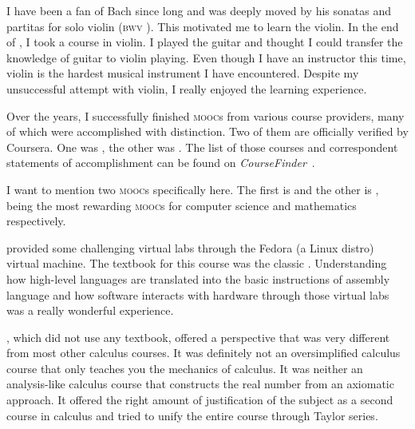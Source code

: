 	I have been a fan of Bach since long and was deeply moved by his sonatas and
	partitas for solo violin (\textsc{bwv} ). This motivated me to
	learn the violin. In the end of , I took a course in violin. I
	played the guitar and thought I could transfer the knowledge of guitar to
	violin playing. Even though I have an instructor this time, violin is the
	hardest musical instrument I have encountered. Despite my unsuccessful attempt
	with violin, I really enjoyed the learning experience.
	
	Over the years, I successfully finished  \textsc{mooc}s from various
	course providers, many of which were accomplished with distinction. Two of them
	are officially verified by Coursera. One was , the other
	was . The list of those  courses and correspondent
	statements of accomplishment can be found on
	\textit{CourseFinder}~\cite{accredible}.
	
	I want to mention two \textsc{mooc}s specifically here. The first is
	 and the other is , being the most rewarding
	\textsc{mooc}s for computer science and mathematics respectively.
	
	 provided some challenging virtual labs through the Fedora (a
	Linux distro) virtual machine. The textbook for this course was the classic
	\textcite{CSAPP}. Understanding how high-level languages are translated
	into the basic instructions of assembly language and how software interacts
	with hardware through those virtual labs was a really wonderful experience.

	, which did not use any textbook, offered a perspective that was
	very different from most other calculus courses. It was definitely not an
	oversimplified calculus course that only teaches you the mechanics of calculus.
	It was neither an analysis-like calculus course that constructs the real number
	from an axiomatic approach. It offered the right amount of justification of the
	subject as a second course in calculus and tried to unify the entire course
	through Taylor series.
	
